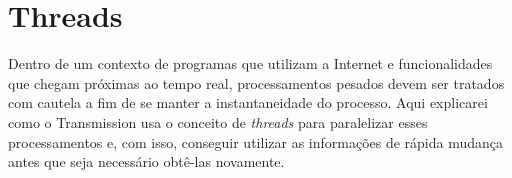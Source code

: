 
\section{Threads}

Dentro de um contexto de programas que utilizam a Internet e funcionalidades que chegam
próximas ao tempo real, processamentos pesados devem ser tratados com cautela a fim de
se manter a instantaneidade do processo. Aqui explicarei como o Transmission usa o
conceito de \emph{threads} para paralelizar esses processamentos e, com isso, conseguir
utilizar as informações de rápida mudança antes que seja necessário obtê-las novamente.
